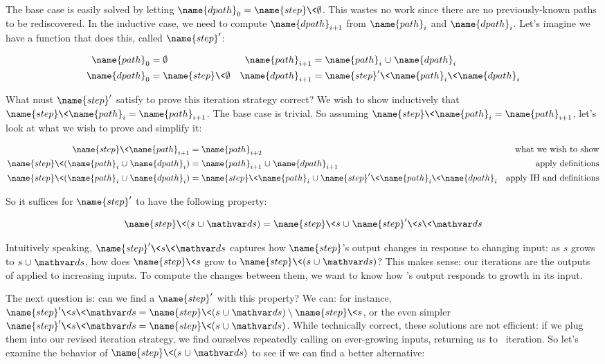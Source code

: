 \noindent
The base case is easily solved by letting $\name{dpath}_0 = \name{step}\<\emptyset$. This wastes no work since there are no previously-known paths to be rediscovered. In the inductive case, we need to compute $\name{dpath}_{i+1}$ from $\name{path}_i$ and $\name{dpath}_i$. Let's imagine we have a function that does this, called $\name{step}'$:

\begin{align*}
  \name{path}_0 &= \emptyset
  &
  \name{path}_{i+1} &= \name{path}_i \cup \name{dpath}_i\\
  \name{dpath}_0 &= \name{step}\<\emptyset
  &
  \name{dpath}_{i+1} &= \name{step}' \<\name{path}_i \<\name{dpath}_i
\end{align*}

\noindent
What must $\name{step}'$ satisfy to prove this iteration strategy correct?
%
We wish to show inductively that $\name{step}\<\name{path}_i = \name{path}_{i+1}$.
%
The base case is trivial. So assuming $\name{step}\<\name{path}_{i} = \name{path}_{i+1}$, let's look at what we wish to prove and simplify it:

\label{proof-seminaive-step-works}
\begin{align*}
  \name{step} \<\name{path}_{i+1}
  &=
  \name{path}_{i+2}
  & \text{what we wish to show}
  \\
  \name{step} \<(\name{path}_i \cup \name{dpath}_i)
  &=
  \name{path}_{i+1} \cup \name{dpath}_{i+1}
  & \text{apply definitions}
  \\
  \name{step} \<(\name{path}_i \cup \name{dpath}_i)
  &=
  \name{step} \<\name{path}_i \cup \name{step}' \<\name{path}_i \<\name{dpath}_i
  & \text{apply IH and definitions}
\end{align*}

\noindent
So it suffices for $\name{step}'$ to have the following property:

\nopagebreak[1]
\[
\name{step}\<(s \cup \ds) = \name{step}\<s \cup \name{step}' \<s \<\ds 
\]

\noindent
Intuitively speaking, $\name{step}' \<s \<\ds$ captures how $\name{step}$'s output changes in response to changing input: as $s$ grows to $s \cup \ds$, how does $\name{step}\<s$ grow to $\name{step}\<(s \cup \ds)$?
%
This makes sense: our iterations are the outputs of  applied to increasing inputs. To compute the changes between them, we want to know how 's output responds to growth in its input.

The next question is: can we find a $\name{step}'$ with this property?
%
We can: for instance, \( \name{step}' \<s \<\ds = \name{step}\<(s
\cup \ds) \setminus \name{step}\<s \), or the even simpler $\name{step}' \<s \<\ds = \name{step}\<(s \cup \ds)$.
%
While technically correct, these solutions are not efficient:
if we plug them into our revised iteration strategy, we find ourselves repeatedly calling  on ever-growing inputs, returning us to \naive\ iteration.
%
So let's examine the behavior of $\name{step} \<(s \cup \ds)$ to see if we can find a better alternative:

